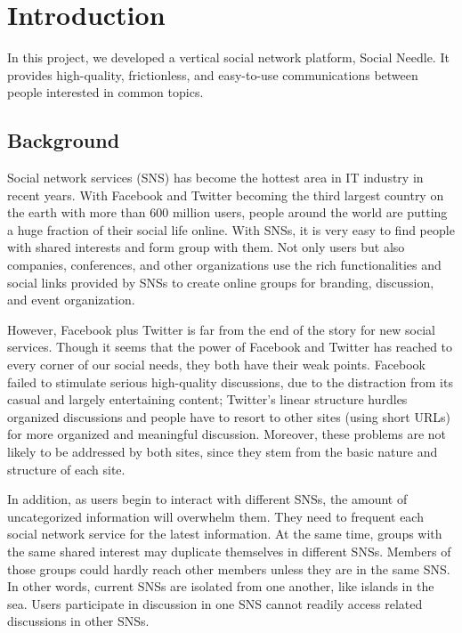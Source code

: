 
%
%

\chapter{Introduction}
In this project, we developed a vertical social network platform, Social Needle. It provides high-quality, frictionless, and easy-to-use communications between people interested in common topics. 

\section{Background}
Social network services (SNS) has become the hottest area in IT industry in recent years. With Facebook and Twitter becoming the third largest country on the earth with more than 600 million users, people around the world are putting a huge fraction of their social life online. With SNSs, it is very easy to find people with shared interests and form group with them. Not only users but also companies, conferences, and other organizations use the rich functionalities and social links provided by SNSs to create online groups for branding, discussion, and event organization.

However, Facebook plus Twitter is far from the end of the story for new social services. Though it seems that the power of Facebook and Twitter has reached to every corner of our social needs, they both have their weak points. Facebook failed to stimulate serious high-quality discussions, due to the distraction from its casual and largely entertaining content; Twitter's linear structure hurdles organized discussions and people have to resort to other sites (using short URLs) for more organized and meaningful discussion. Moreover, these problems are not likely to be addressed by both sites, since they stem from the basic nature and structure of each site.

In addition, as users begin to interact with different SNSs, the amount of uncategorized information will overwhelm them. They need to frequent each social network service for the latest information. At the same time, groups with the same shared interest may duplicate themselves in different SNSs. Members of those groups could hardly reach other members unless they are in the same SNS. In other words, current SNSs are isolated from one another, like islands in the sea. Users participate in discussion in one SNS cannot readily
access related discussions in other SNSs.


